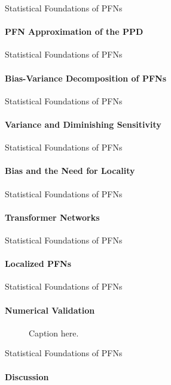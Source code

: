 \begin{frame}{Statistical Foundations of PFNs}
  \framesubtitle{PFN Approximation of the PPD}
\end{frame}
\begin{frame}{Statistical Foundations of PFNs}
  \framesubtitle{Bias-Variance Decomposition of PFNs}
\end{frame}

\begin{frame}{Statistical Foundations of PFNs}
  \framesubtitle{Variance and Diminishing Sensitivity}
\end{frame}

\begin{frame}{Statistical Foundations of PFNs}
  \framesubtitle{Bias and the Need for Locality}
\end{frame}

\begin{frame}{Statistical Foundations of PFNs}
  \framesubtitle{Transformer Networks}
\end{frame}

\begin{frame}{Statistical Foundations of PFNs}
  \framesubtitle{Localized PFNs}
\end{frame}


\begin{frame}{Statistical Foundations of PFNs}
  \framesubtitle{Numerical Validation}
  \begin{figure}
    \centering
    \caption{Caption here.}
  \end{figure}
\end{frame}

\begin{frame}{Statistical Foundations of PFNs}
  \framesubtitle{Discussion}
\end{frame}

